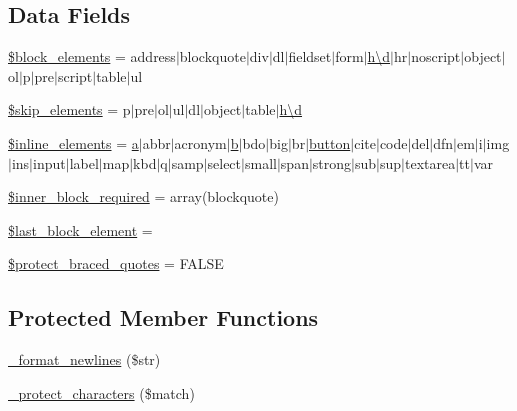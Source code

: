 \subsection*{Data Fields}
\begin{DoxyCompactItemize}
\item 
\hyperlink{class_c_i___typography_ac99f5bbe8e02dc1147e9a4205dc161eb}{\$block\+\_\+elements} = \textquotesingle{}address$\vert$blockquote$\vert$div$\vert$dl$\vert$fieldset$\vert$form$\vert$\hyperlink{jquery_8canvasjs_8min_8js_a36541169dfff685f807208881a4f0021}{h\textbackslash{}d}$\vert$hr$\vert$noscript$\vert$object$\vert$ol$\vert$p$\vert$pre$\vert$script$\vert$table$\vert$ul\textquotesingle{}
\item 
\hyperlink{class_c_i___typography_a80c70a349bff88ad1ef94dea8753bc2e}{\$skip\+\_\+elements} = \textquotesingle{}p$\vert$pre$\vert$ol$\vert$ul$\vert$dl$\vert$object$\vert$table$\vert$\hyperlink{jquery_8canvasjs_8min_8js_a36541169dfff685f807208881a4f0021}{h\textbackslash{}d}\textquotesingle{}
\item 
\hyperlink{class_c_i___typography_a7ee5f0598125dc7e6b17a08aa6da384f}{\$inline\+\_\+elements} = \textquotesingle{}\hyperlink{bootstrap_8min_8js_a1f5870dcf487187f13d5fd328ed9e6e7}{a}$\vert$abbr$\vert$acronym$\vert$\hyperlink{bootstrap_8min_8js_a398bb8542498d1b14178b02b99df309b}{b}$\vert$bdo$\vert$big$\vert$br$\vert$\hyperlink{bootstrap_8min_8js_a55e170814e74f6c3db8ae9ea3ba9054f}{button}$\vert$cite$\vert$code$\vert$del$\vert$dfn$\vert$em$\vert$i$\vert$img$\vert$ins$\vert$input$\vert$label$\vert$map$\vert$kbd$\vert$q$\vert$samp$\vert$select$\vert$small$\vert$span$\vert$strong$\vert$sub$\vert$sup$\vert$textarea$\vert$tt$\vert$var\textquotesingle{}
\item 
\hyperlink{class_c_i___typography_a822eaf22f556c5c52bd766779d9ee22f}{\$inner\+\_\+block\+\_\+required} = array(\textquotesingle{}blockquote\textquotesingle{})
\item 
\hyperlink{class_c_i___typography_a8d5c4b7f2f7b74e118c682cf95688e22}{\$last\+\_\+block\+\_\+element} = \textquotesingle{}\textquotesingle{}
\item 
\hyperlink{class_c_i___typography_a6a74364571da23cc7187c864cde167ca}{\$protect\+\_\+braced\+\_\+quotes} = F\+A\+L\+S\+E
\end{DoxyCompactItemize}
\subsection*{Protected Member Functions}
\begin{DoxyCompactItemize}
\item 
\hyperlink{class_c_i___typography_ac3384cbfc88fcd17e40624bdd6002801}{\+\_\+format\+\_\+newlines} (\$str)
\item 
\hyperlink{class_c_i___typography_a03e8f97de4301e0fe0cf0e9f0bcd936c}{\+\_\+protect\+\_\+characters} (\$match)
\end{DoxyCompactItemize}


